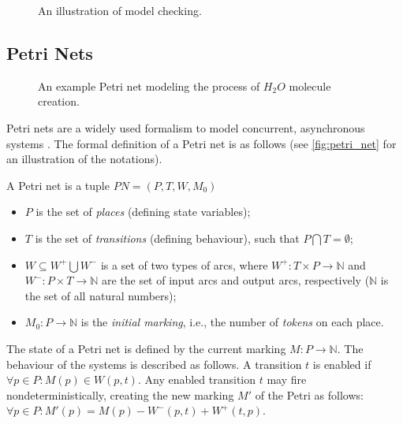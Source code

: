 \begin{figure}[!ht]
	\centering
	
	\caption{An illustration of model checking.}
	\label{fig:model_checking}
\end{figure}

\subsection{Petri Nets}\label{ssec:petri-net}

\begin{figure}[!ht]
	\centering
	
	\caption{An example Petri net modeling the process of \(H_2O\) molecule creation.}
	\label{fig:petri_net}
\end{figure}

Petri nets are a widely used formalism to model concurrent, asynchronous systems \cite{24143}. The formal definition of a Petri net \cite{REISIG19911} is as follows (see \autoref{fig:petri_net} for an illustration of the notations).

\begin{definition}
	
	A Petri net is a tuple \( PN = (P, T, W, M_0) \)
	
	\begin{itemize}
		\item \(P\) is the set of \emph{places} (defining state variables);
		\item \(T\) is the set of \emph{transitions} (defining behaviour), such that \( P \bigcap T = \emptyset \);
		\item \(W \subseteq W^+ \bigcup W^- \) is a set of two types of arcs, where \(  W^+ : T \times P \rightarrow \mathbb{N}\) and \( W^- : P \times T \rightarrow \mathbb{N} \) are the set of input arcs and output arcs, respectively (\( \mathbb{N} \) is the set of all natural numbers);
		\item \(M_0 : P \rightarrow \mathbb{N} \) is the \emph{initial marking}, i.e., the number of \emph{tokens} on each place.
	\end{itemize}
\end{definition}

The state of a Petri net is defined by the current marking \( M : P \rightarrow \mathbb{N} \). The behaviour of the systems is described as follows. A transition \( t \) is enabled if \( \forall p \in P : M(p) \in W(p, t) \). Any enabled transition \(t\) may fire nondeterministically, creating the new marking \( M' \) of the Petri as follows: \( \forall p \in P : M'(p) = M(p) - W^-(p, t) + W^+(t, p) \).

